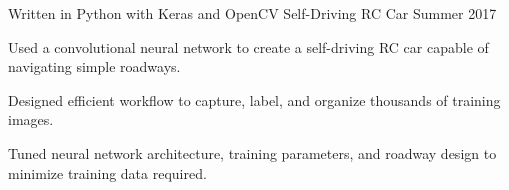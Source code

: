 

\begin{cventries}

  \cventry
    {Written in Python with Keras and OpenCV} %
    {Self-Driving RC Car} %
    {Summer 2017} %
    { } %
    {
      \begin{cvitems} %
        \item {Used a convolutional neural network to create a self-driving RC car capable of navigating simple roadways.}
        \item {Designed efficient workflow to capture, label, and organize thousands of training images.}
        \item {Tuned neural network architecture, training parameters, and roadway design to minimize training data required.}
      \end{cvitems}
    }

\end{cventries}
